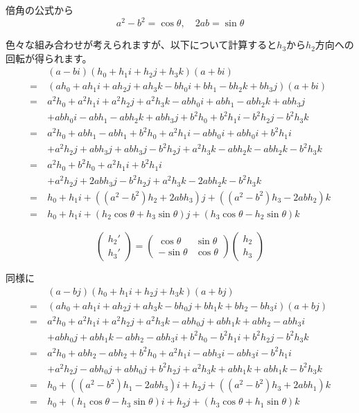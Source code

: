 \documentclass[a4paper,12pt,notitlepage]{jsreport}
\begin{document}
倍角の公式から
\begin{equation}
  a^2-b^2=\cos\theta,\quad 2ab=\sin\theta
\end{equation}

色々な組み合わせが考えられますが、以下について計算すると$h_3$から$h_2$方向への回転が得られます。
\begin{equation}
  \begin{split}
    &(a-bi)(h_0+h_1i+h_2j+h_3k)(a+bi)\\
    =~&(ah_0+ah_1i+ah_2j+ah_3k-bh_0i+bh_1-bh_2k+bh_3j)(a+bi)\\
    =~&a^2h_0+a^2h_1i+a^2h_2j+a^2h_3k-abh_0i+abh_1-abh_2k+abh_3j\\
    &+abh_0i-abh_1-abh_2k+abh_3j+b^2h_0+b^2h_1i-b^2h_2j-b^2h_3k\\
    =~&a^2h_0+abh_1-abh_1+b^2h_0+a^2h_1i-abh_0i+abh_0i+b^2h_1i\\
    &+a^2h_2j+abh_3j+abh_3j-b^2h_2j+a^2h_3k-abh_2k-abh_2k-b^2h_3k\\
    =~&a^2h_0+b^2h_0+a^2h_1i+b^2h_1i\\
    &+a^2h_2j+2abh_3j-b^2h_2j+a^2h_3k-2abh_2k-b^2h_3k\\
    =~&h_0+h_1i+((a^2-b^2)h_2+2abh_3)j+((a^2-b^2)h_3-2abh_2)k\\
    =~&h_0+h_1i+(h_2\cos\theta+h_3\sin\theta)j+(h_3\cos\theta-h_2\sin\theta)k
  \end{split}
\end{equation}

\begin{equation}
  \begin{pmatrix}h_2'\\h_3'\end{pmatrix}
  =\begin{pmatrix}\cos\theta&\sin\theta\\-\sin\theta&\cos\theta\end{pmatrix}
  \begin{pmatrix}h_2\\h_3\end{pmatrix}
\end{equation}

同様に
\begin{equation}
  \begin{split}
    &(a-bj)(h_0+h_1i+h_2j+h_3k)(a+bj)\\
    =~&(ah_0+ah_1i+ah_2j+ah_3k-bh_0j+bh_1k+bh_2-bh_3i)(a+bj)\\
    =~&a^2h_0+a^2h_1i+a^2h_2j+a^2h_3k-abh_0j+abh_1k+abh_2-abh_3i\\
    &+abh_0j+abh_1k-abh_2-abh_3i+b^2h_0-b^2h_1i+b^2h_2j-b^2h_3k\\
    =~&a^2h_0+abh_2-abh_2+b^2h_0+a^2h_1i-abh_3i-abh_3i-b^2h_1i\\
    &+a^2h_2j-abh_0j+abh_0j+b^2h_2j+a^2h_3k+abh_1k+abh_1k-b^2h_3k\\
    =~&h_0+((a^2-b^2)h_1-2abh_3)i+h_2j+((a^2-b^2)h_3+2abh_1)k\\
    =~&h_0+(h_1\cos\theta-h_3\sin\theta)i+h_2j+(h_3\cos\theta+h_1\sin\theta)k\\
  \end{split}
\end{equation}
\end{document}
